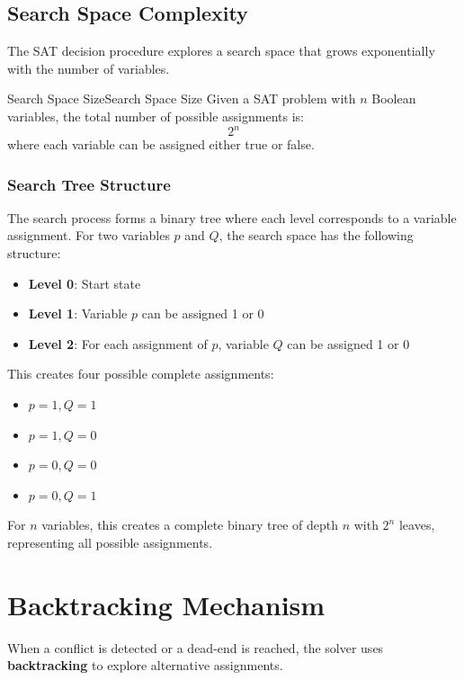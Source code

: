 \documentclass[a4paper]{article}
\theoremstyle{definition}
\begin{document}
\subsection{Search Space Complexity}
The SAT decision procedure explores a search space that grows exponentially with the number of variables.
\begin{definition}{Search Space Size}{Search Space Size}
Given a SAT problem with \( n \) Boolean variables, the total number of possible assignments is:
\[
  2^n
\]
where each variable can be assigned either true or false.
\end{definition}
\subsubsection{Search Tree Structure}
The search process forms a binary tree where each level corresponds to a variable assignment. For two variables \( p \) and \( Q \), the search space has the following structure:
\begin{itemize}
    \item \textbf{Level 0}: Start state
    \item \textbf{Level 1}: Variable \( p \) can be assigned 1 or 0
    \item \textbf{Level 2}: For each assignment of \( p \), variable \( Q \) can be assigned 1 or 0
\end{itemize}
This creates four possible complete assignments:
\begin{itemize}
    \item \( p = 1, Q = 1 \)    
    \item \( p = 1, Q = 0 \)    
    \item \( p = 0, Q = 0 \)    
    \item \( p = 0, Q = 1 \)    
\end{itemize}
For \( n \) variables, this creates a complete binary tree of depth \( n \) with \( 2^n \) leaves, representing all possible assignments.
\section{Backtracking Mechanism}
When a conflict is detected or a dead-end is reached, the solver uses \textbf{backtracking} to explore alternative assignments.
\end{document}
